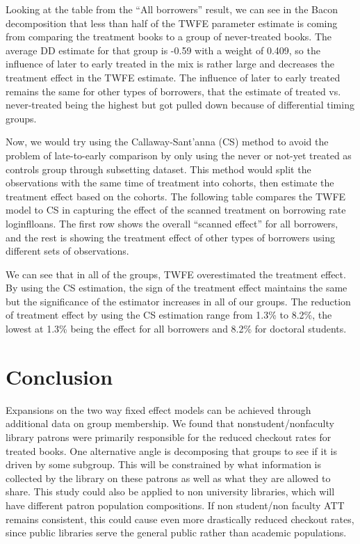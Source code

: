 \documentclass{article}
\begin{document}





Looking at the table from the “All borrowers” result, we can see in the Bacon decomposition that less than half of the TWFE parameter estimate is coming from comparing the treatment books to a group of never-treated books. The average DD estimate for that group is -0.59  with a weight of 0.409, so the influence of later to early treated in the mix is rather large and decreases the treatment effect in the TWFE estimate. The influence of later to early treated remains the same for other types of borrowers, that the estimate of treated vs. never-treated being the highest but got pulled down because of differential timing groups.




Now, we would try using the Callaway-Sant’anna (CS) method to avoid the problem of late-to-early comparison by only using the never or not-yet treated as controls group through subsetting dataset. This method would split the observations with the same time of treatment into cohorts, 
then estimate the treatment effect based on the cohorts.
The following table compares the TWFE model to CS in capturing the effect of the scanned treatment on borrowing rate loginflloans. The first row shows the overall “scanned effect” for all borrowers, and the rest is showing the treatment effect of other types of borrowers using different sets of observations.
 
 
 

 
 
 
We can see that in all of the groups, TWFE overestimated the treatment effect. By using the CS estimation, the sign of the treatment effect maintains the same but the significance of the estimator increases in all of our groups. The reduction of treatment effect by using the CS estimation range from 1.3\% to 8.2\%, the lowest at 1.3\% being the effect for all borrowers and 8.2\% for doctoral students.




\section{Conclusion}
Expansions on the two way fixed effect models can be achieved through additional data on group membership. We found that nonstudent/nonfaculty library patrons were primarily responsible for the reduced checkout rates for treated books. One alternative angle is decomposing that groups to see if it is driven by some subgroup. This will be constrained by what information is collected by the library on these patrons as well as what they are allowed to share. This study could also be applied to non university libraries, which will have different patron population compositions. If non student/non faculty ATT remains consistent, this could cause even more drastically reduced checkout rates, since public libraries serve the general public rather than academic populations.
\end{document}
